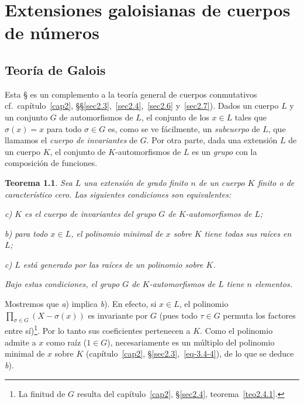 \documentclass[bibtotoc,leqno,spanish]{amsbook}
\numberwithin{equation}{section}
\theoremstyle{note}
\theoremstyle{note}
\newtheorem{theorem}{Teorema}
\theoremstyle{rem}
\numberwithin{theorem}{section}
\numberwithin{proposition}{section}
\numberwithin{definition}{section}
\numberwithin{lemma}{section}
\numberwithin{corollary}{section}
\numberwithin{example}{section}
\numberwithin{footnote}{section}%
\begin{document}
\chapter{Extensiones galoisianas de cuerpos de n\'umeros}

\section{Teor\'ia de Galois}\label{sec6.1}

Esta {\S} es un complemento a la teor\'ia general de cuerpos conmutativos
cf.~cap\'itulo~\ref{cap2}, \S\S\ref{sec2.3},~\ref{sec2.4},~\ref{sec2.6} y~\ref{sec2.7}).
Dados un cuerpo $L$ y un conjunto $G$ de automorfismos de $L$, el conjunto de los $x\in L$ tales que
$\sigma(x) = x$ para todo $\sigma\in G$ es, como se ve f\'acilmente, un {\em subcuerpo} de $L$, que llamamos
el {\em cuerpo de invariantes} de $G$. Por otra parte, dada una extensi\'on $L$ de un cuerpo $K$, el conjunto
de $K$-automorfismos de $L$ es un {\em grupo} con la composici\'on de funciones.

\begin{theorem}\label{teo6.1.1}
Sea $L$ una extensi\'on de grado finito $n$ de un cuerpo $K$ finito o de caracter\'istico cero. Las siguientes
condiciones son equivalentes:
\begin{trivlist}\setlength{\itemindent}{\parindent}
\item c) $K$ es el cuerpo de invariantes del grupo $G$ de $K$-automorfismos de $L$;
\item b) para todo $x\in L$, el polinomio minimal de $x$ sobre $K$ tiene todas sus ra\'ices en $L$;
\item c) $L$ est\'a generado por las ra\'ices de un polinomio sobre $K$.
\end{trivlist}
Bajo estas condiciones, el grupo $G$ de $K$-automorfismos de $L$ tiene $n$ elementos.
\end{theorem}

Mostremos que {\itshape a}) implica {\itshape b}). En efecto, si $x\in L$, el polinomio
$\prod_{\sigma\in G}(X-\sigma(x))$ es invariante por $G$ (pues todo $\tau\in G$ permuta los factores
entre s\'i)\footnote{La finitud de $G$ resulta del cap\'itulo~\ref{cap2}, \S\ref{sec2.4}, teorema~\ref{teo2.4.1}.}. Por lo tanto
sus coeficientes pertenecen a $K$. Como el polinomio admite a $x$ como ra\'iz ($1\in G$), necesariamente
es un m\'ultiplo del polinomio minimal de $x$ sobre $K$ (cap\'itulo~\ref{cap2}, \S\ref{sec2.3},~\eqref{eq-3.4-4}), de
lo que se deduce {\itshape b}).
\end{document}
